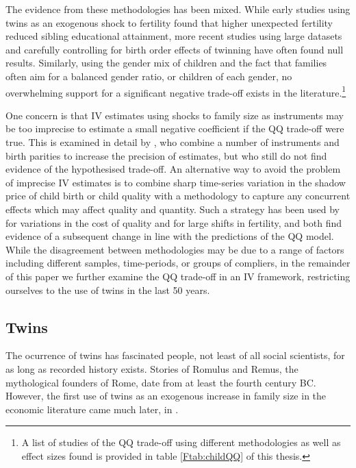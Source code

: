 The evidence from these methodologies has been mixed. While early studies using 
twins as an exogenous shock to fertility found that higher unexpected fertility
reduced sibling educational attainment, more recent studies using large datasets
and carefully controlling for birth order effects of twinning have often found
null results.  Similarly, using the gender mix of children and the fact that
families often aim for a balanced gender ratio, or children of each gender,
no overwhelming support for a significant negative trade-off exists in the 
literature.\footnote{A list of studies of the QQ trade-off using different
methodologies as well as effect sizes found is provided in table 
\ref{Ftab:childQQ} of this thesis.}  

One concern is that IV estimates using shocks to family size as instruments may 
be too imprecise to estimate a small negative coefficient if the QQ trade-off 
were true.  This is examined in detail by \citet{Angristetal2010}, who combine a 
number of instruments and birth parities to increase the precision of estimates, 
but who still do not find evidence of the hypothesised trade-off. An alternative 
way to avoid the problem of imprecise IV estimates is to combine sharp 
time-series variation in the shadow price of child birth or child quality with 
a methodology to capture any concurrent effects which may affect quality and
quantity. Such a strategy has been used by \citet{BleakleyLange2009} for 
variations in the cost of quality and \citep{DalgaardStrulik2015} for large 
shifts in fertility, and both find evidence of a subsequent change in line with
the predictions of the QQ model. While the disagreement between methodologies
may be due to a range of factors including different samples, time-periods, or
groups of compliers, in the remainder of this paper we further examine the QQ
trade-off in an IV framework, restricting ourselves to the use of twins in the 
last 50 years.

\subsection{Twins}
The ocurrence of twins has fascinated people, not least of all social 
scientists, for as long as recorded history exists. Stories of Romulus and 
Remus, the mythological founders of Rome, date from at least the fourth century 
BC. However, the first use of twins as an exogenous increase in family size in 
the economic literature came much later, in \citet{RosenzweigWolpin1980}.

